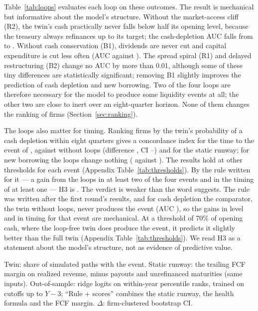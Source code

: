 \documentclass[11pt]{article}
\begin{document}
Table~\ref{tab:loops} evaluates each loop on these outcomes. The result is mechanical but informative about the model's structure. Without the market-access cliff (R2), the twin's cash practically never falls below half its opening level, because the treasury always refinances up to its target; the cash-depletion AUC falls from \DecCashTwin{} to \DecCashNoRtwo. Without cash conservation (B1), dividends are never cut and capital expenditure is cut less often (AUC \DecCapexNoBone{} against \DecCapexTwin). The spread spiral (R1) and delayed restructuring (B2) change no AUC by more than 0.01, although some of these tiny differences are statistically significant; removing B1 slightly improves the prediction of cash depletion and new borrowing. Two of the four loops are therefore necessary for the model to produce some liquidity events at all; the other two are close to inert over an eight-quarter horizon. None of them changes the ranking of firms (Section~\ref{sec:ranking}).

The loops also matter for timing. Ranking firms by the twin's probability of a cash depletion within eight quarters
gives a concordance index for the time to the event of \TimCashTwin, against \TimCashNoLoops{} without loops (difference
\TimCashDiff, CI \TimCashDiffLo--\TimCashDiffHi) and \TimCashStatic{} for the static runway; for new borrowing the loops
change nothing (\TimDebtTwin{} against \TimDebtNoLoops). The results hold at other thresholds for each event (Appendix
Table~\ref{tab:thresholds}). By the rule written for it --- a gain from the loops in at least two of the four events and in
the timing of at least one --- H3 is \HThreeVerdict. The verdict is weaker than the word suggests. The rule was written after the first round's results, and for cash depletion the comparator, the twin without loops, never produces the event (AUC \TimCashNoLoops), so the gains in level and in timing for that event are mechanical. At a threshold of 70\% of opening cash, where the loop-free twin does produce the event, it predicts it slightly better than the full twin (Appendix Table~\ref{tab:thresholds}). We read H3 as a statement about the model's structure, not as evidence of predictive value.

\begin{table}[t]
\centering\scriptsize
\caption{Liquidity events given the realized revenue}
\label{tab:decisions}

\par\smallskip
\begin{minipage}{\linewidth}\footnotesize
Twin: share of simulated paths with the event. Static runway: the trailing FCF margin on realized revenue, minus payouts and unrefinanced maturities (same inputs). Out-of-sample: ridge logits on within-year percentile ranks, trained on cutoffs up to $Y-3$; ``Rule + scores'' combines the static runway, the health formula and the FCF margin. $\Delta$: firm-clustered bootstrap CI.
\end{minipage}
\end{table}
\end{document}
